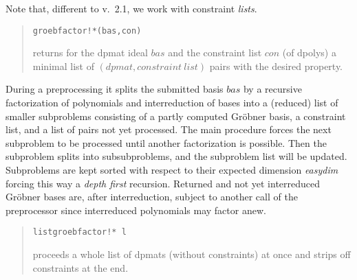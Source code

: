 \documentclass[a4paper,11pt]{article}
\newcommand{\gr}{Gr\"obner}
\newcommand{\ind}[1]{{\em #1}\index{#1}}
\newcommand{\pbx}[1]{\mbox{}\hfill \parbox[t]{12cm}{#1} \pagebreak[3]}
\begin{document}
Note that, different to v.\ 2.1, we work with constraint {\em lists}.
\begin{quote}
\verb|groebfactor!*(bas,con)|

\pbx{returns for the dpmat ideal $bas$ and the constraint list $con$
(of dpolys) a minimal list of $(dpmat, constraint\ list)$ pairs with
the desired property.}
\end{quote}
During a preprocessing it splits the submitted basis $bas$ by a
recursive factorization of polynomials and interreduction of bases
into a (reduced) list of smaller subproblems consisting of a partly
computed {\gr} basis, a constraint list, and a list of pairs not yet
processed. The main procedure forces the next subproblem to be
processed until another factorization is possible. Then the
subproblem splits into subsubproblems, and the subproblem list will
be updated. Subproblems are kept sorted with respect to their
expected dimension \ind{easydim} forcing this way a {\em depth first}
recursion.  Returned and not yet interreduced {\gr} bases are, after
interreduction, subject to another call of the preprocessor since
interreduced polynomials may factor anew.
\begin{quote}
\verb|listgroebfactor!* l| 

\pbx{proceeds a whole list of dpmats (without constraints) at once and
strips off constraints at the end.}
\end{quote}
\medskip
\end{document}
